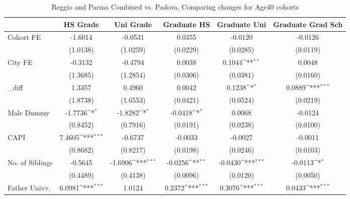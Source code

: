 \begin{table}[htbp]\centering
\def\sym#1{\ifmmode^{#1}\else\(^{#1}\)\fi}
\caption{Reggio and Parma Combined vs. Padova, Comparing changes for Age40 cohorts}
\begin{tabular}{l*{5}{c}}
\toprule
            &\multicolumn{1}{c}{HS Grade}&\multicolumn{1}{c}{Uni Grade}&\multicolumn{1}{c}{Graduate HS}&\multicolumn{1}{c}{Graduate Uni}&\multicolumn{1}{c}{Graduate Grad Sch}\\
\midrule
Cohort FE   &     -1.6014         &     -0.0531         &      0.0355         &     -0.0120         &     -0.0126         \\
            &    (1.0138)         &    (1.0259)         &    (0.0229)         &    (0.0285)         &    (0.0119)         \\
\addlinespace
City FE     &     -0.3132         &     -0.4794         &      0.0038         &      0.1044\sym{**} &      0.0048         \\
            &    (1.3685)         &    (1.2854)         &    (0.0306)         &    (0.0381)         &    (0.0160)         \\
\addlinespace
\_diff       &      1.3357         &      0.4960         &      0.0042         &      0.1238\sym{*}  &      0.0889\sym{***}\\
            &    (1.8738)         &    (1.6553)         &    (0.0421)         &    (0.0524)         &    (0.0219)         \\
\addlinespace
Male Dummy  &     -1.7736\sym{*}  &     -1.8282\sym{*}  &     -0.0418\sym{*}  &      0.0068         &     -0.0124         \\
            &    (0.8452)         &    (0.7916)         &    (0.0191)         &    (0.0238)         &    (0.0100)         \\
\addlinespace
CAPI        &      7.4605\sym{***}&     -0.6737         &     -0.0033         &     -0.0027         &     -0.0011         \\
            &    (0.8682)         &    (0.8217)         &    (0.0198)         &    (0.0246)         &    (0.0103)         \\
\addlinespace
No. of Siblings&     -0.5645         &     -1.6906\sym{***}&     -0.0256\sym{**} &     -0.0430\sym{***}&     -0.0113\sym{*}  \\
            &    (0.4489)         &    (0.4138)         &    (0.0096)         &    (0.0120)         &    (0.0050)         \\
\addlinespace
Father Univv.&      6.0981\sym{***}&      1.0124         &      0.2372\sym{***}&      0.3076\sym{***}&      0.0433\sym{***}\\

\end{tabular}
\end{table}
